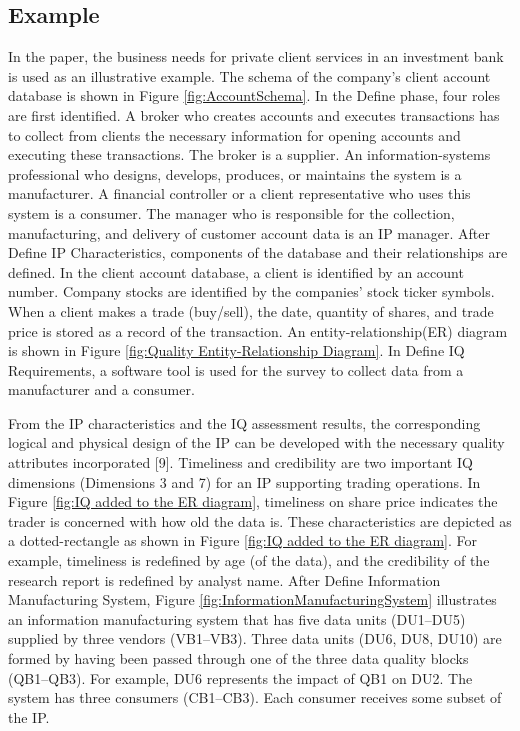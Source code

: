 \documentclass[pdftex,english,oribibl]{llncs}
\begin{document}
\subsection{Example}

In the paper, the business needs for private client services in an investment bank is used as an illustrative example. The schema of the company’s client account database is shown in Figure \ref{fig:AccountSchema}.
In the Define phase, four roles are first identified. A broker who creates accounts and executes transactions has to collect from
clients the necessary information for opening accounts and executing these transactions.
The broker is a supplier. An information-systems professional who designs, develops, produces, or maintains the system is a manufacturer. A financial controller or a client representative who uses this system is a consumer. The manager who is responsible for the collection, manufacturing, and delivery of customer account data is an IP manager. After Define IP Characteristics, components of the database and their relationships are defined.
In the client account database, a client is identified by an
account number. Company stocks are identified by the
companies’ stock ticker symbols. When a client makes
a trade (buy/sell), the date, quantity of shares, and trade
price is stored as a record of the transaction. An entity-relationship(ER) diagram is shown in Figure \ref{fig:Quality Entity-Relationship Diagram}. In Define IQ Requirements, a software tool is used for the survey to collect data from a manufacturer and a consumer.

From the IP characteristics and the IQ assessment
results, the corresponding logical and physical design of
the IP can be developed with the necessary quality
attributes incorporated [9]. Timeliness and credibility
are two important IQ dimensions (Dimensions 3 and 7)
for an IP supporting trading operations. In Figure \ref{fig:IQ added to the ER diagram},
timeliness on share price indicates the trader is concerned with how old the data is. These characteristics are depicted as a dotted-rectangle as shown in Figure \ref{fig:IQ added to the ER diagram}. For example, timeliness is redefined by age
(of the data), and the credibility of the research report is
redefined by analyst name.
After Define Information Manufacturing System, Figure \ref{fig:InformationManufacturingSystem} illustrates an
information manufacturing system that has five data units (DU1–DU5) supplied by three vendors
(VB1–VB3). Three data units (DU6, DU8, DU10) are
formed by having been passed through one of the three
data quality blocks (QB1–QB3). For example, DU6 represents the impact of QB1 on DU2. The system has three consumers
(CB1–CB3). Each consumer receives some subset of the IP.
\end{document}
